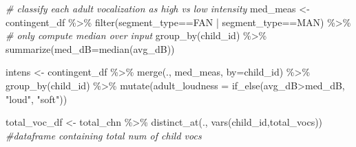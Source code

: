 \documentclass[
]{article}
\newenvironment{Shaded}{\begin{snugshade}}{\end{snugshade}}
\newcommand{\AttributeTok}[1]{\textcolor[rgb]{0.77,0.63,0.00}{#1}}
\newcommand{\CommentTok}[1]{\textcolor[rgb]{0.56,0.35,0.01}{\textit{#1}}}
\newcommand{\FunctionTok}[1]{\textcolor[rgb]{0.00,0.00,0.00}{#1}}
\newcommand{\NormalTok}[1]{#1}
\newcommand{\OtherTok}[1]{\textcolor[rgb]{0.56,0.35,0.01}{#1}}
\newcommand{\SpecialCharTok}[1]{\textcolor[rgb]{0.00,0.00,0.00}{#1}}
\newcommand{\StringTok}[1]{\textcolor[rgb]{0.31,0.60,0.02}{#1}}
\begin{document}
\begin{Shaded}
\begin{Highlighting}[]
\CommentTok{\# classify each adult vocalization as high vs low intensity}
\NormalTok{med\_meas }\OtherTok{\textless{}{-}}\NormalTok{ contingent\_df }\SpecialCharTok{\%\textgreater{}\%}
  \FunctionTok{filter}\NormalTok{(segment\_type}\SpecialCharTok{==}\StringTok{\textquotesingle{}FAN\textquotesingle{}} \SpecialCharTok{|}\NormalTok{ segment\_type}\SpecialCharTok{==}\StringTok{\textquotesingle{}MAN\textquotesingle{}}\NormalTok{) }\SpecialCharTok{\%\textgreater{}\%} \CommentTok{\# only compute median over input}
  \FunctionTok{group\_by}\NormalTok{(child\_id) }\SpecialCharTok{\%\textgreater{}\%}
  \FunctionTok{summarize}\NormalTok{(}\AttributeTok{med\_dB=}\FunctionTok{median}\NormalTok{(avg\_dB))}

\NormalTok{intens }\OtherTok{\textless{}{-}}\NormalTok{ contingent\_df }\SpecialCharTok{\%\textgreater{}\%}
  \FunctionTok{merge}\NormalTok{(., med\_meas, }\AttributeTok{by=}\StringTok{\textquotesingle{}child\_id\textquotesingle{}}\NormalTok{) }\SpecialCharTok{\%\textgreater{}\%}
  \FunctionTok{group\_by}\NormalTok{(child\_id) }\SpecialCharTok{\%\textgreater{}\%}
  \FunctionTok{mutate}\NormalTok{(}\AttributeTok{adult\_loudness =} \FunctionTok{if\_else}\NormalTok{(avg\_dB}\SpecialCharTok{\textgreater{}}\NormalTok{med\_dB, }\StringTok{"loud"}\NormalTok{, }\StringTok{"soft"}\NormalTok{))}

\NormalTok{total\_voc\_df }\OtherTok{\textless{}{-}}\NormalTok{ total\_chn }\SpecialCharTok{\%\textgreater{}\%} \FunctionTok{distinct\_at}\NormalTok{(., }\FunctionTok{vars}\NormalTok{(child\_id,total\_vocs)) }\CommentTok{\#dataframe containing total num of child vocs }


\end{Highlighting}
\end{Shaded}
\end{document}
